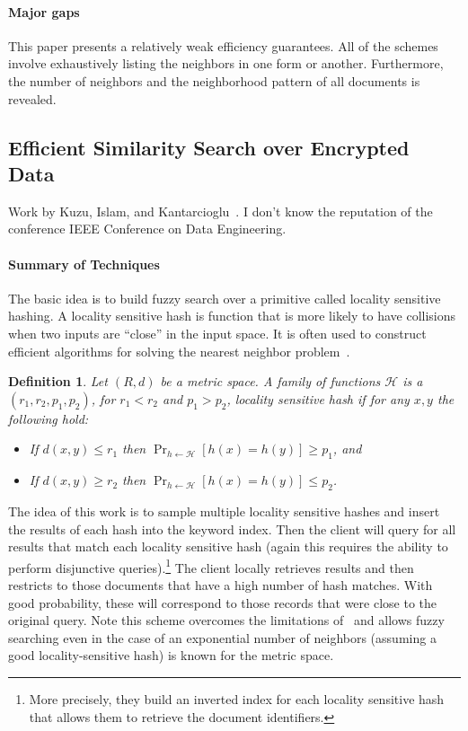 \documentclass[11pt]{article}
\newtheorem{definition}{Definition}[section]
\theoremstyle{remark}
\begin{document}
\paragraph{Major gaps}
This paper presents a relatively weak efficiency guarantees.  All of the schemes involve exhaustively listing the neighbors in one form or another.  Furthermore, the number of neighbors and the neighborhood pattern of all documents is revealed.

\subsection{Efficient Similarity Search over Encrypted Data}
Work by Kuzu, Islam, and Kantarcioglu~\cite{kuzu2012efficient}.  I don't know the reputation of the conference IEEE Conference on Data Engineering.  

\paragraph{Summary of Techniques} The basic idea is to build fuzzy search over a primitive called locality sensitive hashing.  A locality sensitive hash is function that is more likely to have collisions when two inputs are ``close'' in the input space.  It is often used to construct efficient algorithms for solving the nearest neighbor problem~\cite{datar2004locality,slaney2008locality}.  

\begin{definition}
Let $(R,d)$ be a metric space.  A family of functions $\mathcal{H}$ is a $(r_1, r_2, p_1, p_2)$, for $r_1< r_2$ and $p_1 >p_2$, locality sensitive hash if for any $x, y$ the following hold:
\begin{itemize}
\item If $d(x, y) \le r_1$ then $\Pr_{h\leftarrow \mathcal{H}}[h(x) = h(y)] \ge p_1$, and 
\item If $d(x, y) \ge r_2$ then $\Pr_{h\leftarrow \mathcal{H}}[h(x) = h(y)] \le p_2$.
\end{itemize}
\end{definition}

The idea of this work is to sample multiple locality sensitive hashes and insert the results of each hash into the keyword index.  Then the client will query for all results that match each locality sensitive hash (again this requires the ability to perform disjunctive queries).\footnote{More precisely, they build an inverted index for each locality sensitive hash that allows them to retrieve the document identifiers.}  The client locally retrieves results and then restricts to those documents that have a high number of hash matches.  With good probability, these will correspond to those records that were close to the original query.  Note this scheme overcomes the limitations of~\cite{li2010fuzzy} and allows fuzzy searching even in the case of an exponential number of neighbors (assuming a good locality-sensitive hash) is known for the metric space.
\end{document}
